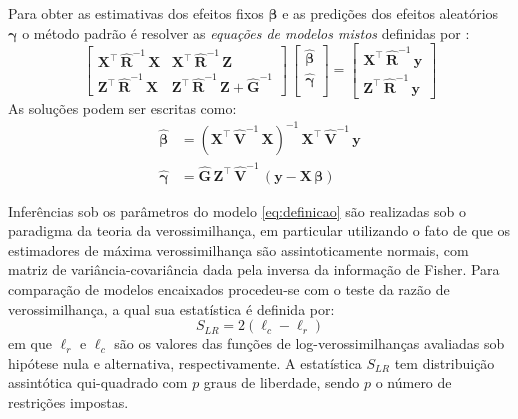 \documentclass[12pt,a4paper,final]{article}
\begin{document}
Para obter as estimativas dos efeitos fixos $ \bm{\beta} $ e as predições dos efeitos aleatórios 
$ \bm{\gamma} $ o método padrão é resolver as \emph{equações de modelos mistos} definidas por :
\begin{equation}\label{eq:emm}
\left[\begin{array}{cc}
\mathbf{X}^\top\,\mathbf{\widehat{R}}^{-1}\,\mathbf{X} & \mathbf{X}^\top\,\mathbf{\widehat{R}}^{-1}\,\mathbf{Z} \\
\mathbf{Z}^\top\,\mathbf{\widehat{R}}^{-1}\,\mathbf{X} & \mathbf{Z}^\top\,\mathbf{\widehat{R}}^{-1}\,\mathbf{Z} + 
\mathbf{\widehat{G}}^{-1}
\end{array}\right]\,
\left[\begin{array}{c}
\widehat{\bm{\beta}} \\
\widehat{\bm{\gamma}} \\
\end{array} \right] =
\left[\begin{array}{cc}
\mathbf{X}^\top\,\mathbf{\widehat{R}}^{-1}\,\mathbf{y}\\
\mathbf{Z}^\top\,\mathbf{\widehat{R}}^{-1}\,\mathbf{y}
\end{array}
\right]
\end{equation}
As soluções podem ser escritas como:
\begin{equation}\label{eq:emm2}
\begin{split}
\widehat{\bm{\beta}}  &= \left(\mathbf{X}^\top\,\mathbf{\widehat{V}}^{-1}\,\mathbf{X}\right)^{-1}\,\mathbf{X}^\top\,
\widehat{\mathbf{V}}^{-1}\,\mathbf{y}\\
\widehat{\bm{\gamma}} &= \widehat{\mathbf{G}}\,\mathbf{Z}^\top\,\widehat{\mathbf{V}}^{-1}\,
\left(\mathbf{y} - \mathbf{X}\,\bm{\beta}\right)
\end{split}
\end{equation}

\newpage
Inferências sob os parâmetros do modelo \eqref{eq:definicao} são realizadas sob o paradigma da teoria da verossimilhança,
em particular utilizando o fato de que os estimadores de máxima verossimilhança são assintoticamente normais, com 
matriz de variância-covariância dada pela inversa da informação de Fisher. Para comparação de modelos encaixados
procedeu-se com o teste da razão de verossimilhança, a qual sua estatística é definida por:
\begin{equation}
\label{eq:trv}
S_{LR} =  2\left(\ell_c - \ell_r\right)
\end{equation}
em que $ \ell_r $ e $ \ell_c $ são os valores das funções de log-verossimilhanças avaliadas sob hipótese nula e alternativa, respectivamente. A estatística $ S_{LR} $ tem distribuição assintótica qui-quadrado com $ p $ graus de liberdade, sendo $ p $ o número de restrições impostas.
\end{document}

